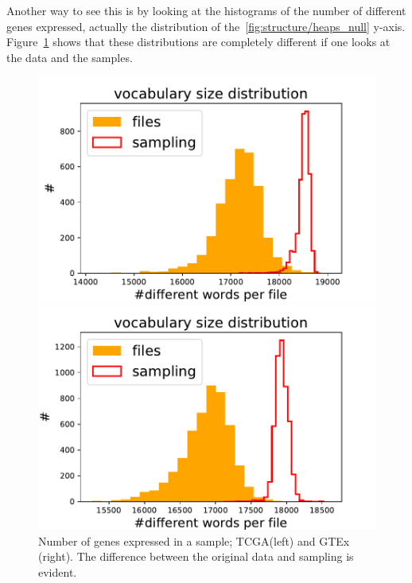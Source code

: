 Another way to see this is by looking at the histograms of the number of different genes expressed, actually the distribution of the~\ref{fig:structure/heaps_null} y-axis. Figure~\ref{fig:structure/diffwordsDistr_null} shows that these distributions are completely different if one looks at the data and the samples.
\begin{figure}[htb!]
\begin{minipage}{0.5\textwidth}
    \centering
    \includegraphics[width=0.95\linewidth]{pictures/structure/tcga/diffwordsDistr_null.pdf}
    \end{minipage}
\hspace{2mm}
\begin{minipage}{0.5\textwidth}
    \centering
    \includegraphics[width=0.95\linewidth]{pictures/structure/gtex/diffwordsDistr_null.pdf}
    \end{minipage}
\caption{Number of genes expressed in a sample; TCGA(left) and GTEx (right). The difference between the original data and sampling is evident.}
\label{fig:structure/diffwordsDistr_null}
\end{figure}